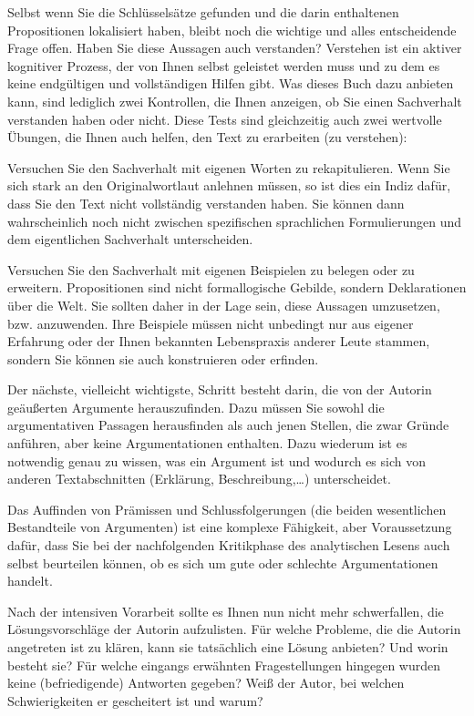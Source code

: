 \documentclass[]{book}
\theoremstyle{definition}
\theoremstyle{definition}
\theoremstyle{definition}
\theoremstyle{remark}
\begin{document}
Selbst wenn Sie die Schlüsselsätze gefunden und die darin enthaltenen
Propositionen lokalisiert haben, bleibt noch die wichtige und alles
entscheidende Frage offen. Haben Sie diese Aussagen auch verstanden?
Verstehen ist ein aktiver kognitiver Prozess, der von Ihnen selbst
geleistet werden muss und zu dem es keine endgültigen und vollständigen
Hilfen gibt. Was dieses Buch dazu anbieten kann, sind lediglich zwei
Kontrollen, die Ihnen anzeigen, ob Sie einen Sachverhalt verstanden
haben oder nicht. Diese Tests sind gleichzeitig auch zwei wertvolle
Übungen, die Ihnen auch helfen, den Text zu erarbeiten (zu verstehen):

Versuchen Sie den Sachverhalt mit eigenen Worten zu rekapitulieren. Wenn
Sie sich stark an den Originalwortlaut anlehnen müssen, so ist dies ein
Indiz dafür, dass Sie den Text nicht vollständig verstanden haben. Sie
können dann wahrscheinlich noch nicht zwischen spezifischen sprachlichen
Formulierungen und dem eigentlichen Sachverhalt unterscheiden.

Versuchen Sie den Sachverhalt mit eigenen Beispielen zu belegen oder zu
erweitern. Propositionen sind nicht formallogische Gebilde, sondern
Deklarationen über die Welt. Sie sollten daher in der Lage sein, diese
Aussagen umzusetzen, bzw. anzuwenden. Ihre Beispiele müssen nicht
unbedingt nur aus eigener Erfahrung oder der Ihnen bekannten
Lebenspraxis anderer Leute stammen, sondern Sie können sie auch
konstruieren oder erfinden.

Der nächste, vielleicht wichtigste, Schritt besteht darin, die von der
Autorin geäußerten Argumente herauszufinden. Dazu müssen Sie sowohl die
argumentativen Passagen herausfinden als auch jenen Stellen, die zwar
Gründe anführen, aber keine Argumentationen enthalten. Dazu wiederum ist
es notwendig genau zu wissen, was ein Argument ist und wodurch es sich
von anderen Textabschnitten (Erklärung, Beschreibung,\ldots{})
unterscheidet.

Das Auffinden von Prämissen und Schlussfolgerungen (die beiden
wesentlichen Bestandteile von Argumenten) ist eine komplexe Fähigkeit,
aber Voraussetzung dafür, dass Sie bei der nachfolgenden Kritikphase des
analytischen Lesens auch selbst beurteilen können, ob es sich um gute
oder schlechte Argumentationen handelt.

Nach der intensiven Vorarbeit sollte es Ihnen nun nicht mehr
schwerfallen, die Lösungsvorschläge der Autorin aufzulisten. Für welche
Probleme, die die Autorin angetreten ist zu klären, kann sie tatsächlich
eine Lösung anbieten? Und worin besteht sie? Für welche eingangs
erwähnten Fragestellungen hingegen wurden keine (befriedigende)
Antworten gegeben? Weiß der Autor, bei welchen Schwierigkeiten er
gescheitert ist und warum?
\end{document}
